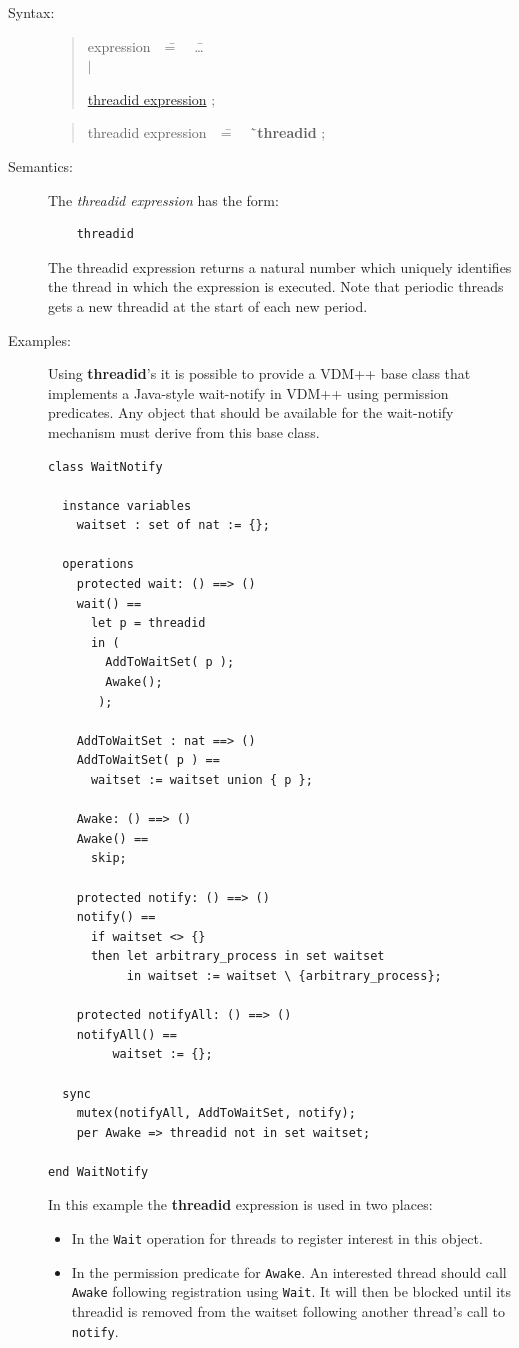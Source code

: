 \documentclass{overturerepchap}
\newcommand{\Rule}[2]{
  \begin{quote}\begin{tabbing}
    #1\index{#1}\ \ \= = \ \ \= #2  ; %
    
  \end{tabbing}\end{quote}
  }
\newcommand{\Ruleref}[1]{
  \hyperlink{rule:#1}{#1}}
\newcommand{\dsep}{\\ \> $|$ \>}
\newcommand{\Lop}[1]{`{\bf\ttfamily #1}\Quote}
\begin{document}
\begin{description}
\item[Syntax:] 
  \Rule{expression}{
    \ldots \dsep
    \Ruleref{threadid expression} 
    }
  \Rule{threadid expression}{
    \Lop{threadid}
  }
  
\item[Semantics:] The {\it threadid expression} has the form:

  \begin{lstlisting}
    threadid
  \end{lstlisting}
  The threadid expression returns a natural number which uniquely
  identifies the thread in which the expression is executed. Note that 
  periodic threads gets a new threadid at the start of each new period.

\item[Examples:] 
Using {\bf\ttfamily threadid}'s it is possible to provide a VDM++ base class that
implements a Java-style wait-notify in VDM++ using permission
predicates. Any object that should be available for the wait-notify
mechanism must derive from this base class.  
\begin{lstlisting}
class WaitNotify

  instance variables
    waitset : set of nat := {};

  operations
    protected wait: () ==> ()
    wait() == 
      let p = threadid
      in (
        AddToWaitSet( p );
        Awake();
       );

    AddToWaitSet : nat ==> ()
    AddToWaitSet( p ) ==
      waitset := waitset union { p };
      
    Awake: () ==> ()
    Awake() == 
      skip;
  
    protected notify: () ==> ()
    notify() == 
      if waitset <> {} 
      then let arbitrary_process in set waitset
           in waitset := waitset \ {arbitrary_process};

    protected notifyAll: () ==> ()
    notifyAll() ==
         waitset := {};

  sync
    mutex(notifyAll, AddToWaitSet, notify);
    per Awake => threadid not in set waitset;

end WaitNotify
\end{lstlisting}
In this example the {\bf\ttfamily threadid} expression is used in two places:
\begin{itemize}
\item In the \texttt{Wait} operation for threads to register interest
  in this object.
\item In the permission predicate for \texttt{Awake}. An interested
  thread should call \texttt{Awake} following registration using
  \texttt{Wait}. It will then be blocked until its threadid is removed
  from the waitset following another thread's call to \texttt{notify}.
\end{itemize}

\end{description}
\end{document}
